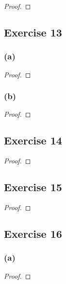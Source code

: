 \documentclass[14pt]{extarticle}
\begin{document}
\begin{proof}

\end{proof}

\subsection{Exercise 13}

\subsubsection{(a)}

\begin{proof}

\end{proof}

\subsubsection{(b)}

\begin{proof}

\end{proof}

\subsection{Exercise 14}

\begin{proof}

\end{proof}

\subsection{Exercise 15}

\begin{proof}

\end{proof}

\subsection{Exercise 16}

\subsubsection{(a)}

\begin{proof}

\end{proof}
\end{document}
